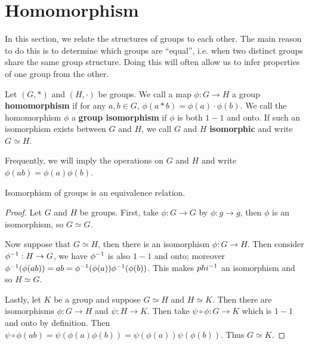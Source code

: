 \section{Homomorphism}
\label{section_1.5}

In this section, we relate the structures of groups to each other. The main
reason to do this is to determine which groups are ``equal'', i.e. when two
distinct groups share the same group structure. Doing this will often allow us
to infer properties of one group from the other.

\begin{definition}
  Let $(G, \ast)$ and $(H, \cdot)$ be groups. We call a map $\phi:G
  \rightarrow H$ a group \textbf{homomorphism} if for any $a,b \in G$,
  $\phi(a \ast b)=\phi(a) \cdot \phi(b)$. We call the homomorphism $\phi$ a
  \textbf{group isomorphism} if $\phi$ is both  $1-1$ and onto. If such an
  isomorphism exists between  $G$ and  $H$, we call  $G$ and  $H$
  \textbf{isomorphic} and write $G \simeq H$.
\end{definition}
\begin{remark}
  Frequently, we will imply the operations on $G$ and  $H$ and write
  $\phi(ab)=\phi(a)\phi(b)$.
\end{remark}

\begin{lemma}\label{lemma_1.5.1}
  Isomorphism of groups is an equivalence relation.
\end{lemma}
\begin{proof}
  Let $G$ and  $H$ be groups. First, take $\phi:G \rightarrow G$ by $\phi:g
  \rightarrow g$, then $\phi$ is an isomorphism, so $G \simeq G$.

  Now suppose that  $G \simeq H$, then there is an isomorphism  $\phi:G
  \rightarrow H$. Then consider $\phi^{-1}:H \rightarrow G$, we have
  $\phi^{-1}$ is also $1-1$ and onto; moreover
  $\phi^{-1}(\phi(ab))=ab=\phi^{-1}(\phi(a))\phi^{-1}(\phi(b))$. This makes
  $phi^{-1}$ an isomorphism and so $H \simeq G$.

  Lastly, let  $K$ be a group and suppose  $G \simeq H$ and  $H \simeq K$.
  Then there are isomorphisms  $\phi:G \rightarrow H$ and $\psi:H \rightarrow
  K$. Then take $\psi \circ \phi:G \rightarrow K$ which is $1-1$ and onto by
  definition. Then $\psi \circ
  \phi(ab)=\psi(\phi(a)\phi(b))=\psi(\phi(a))\psi(\phi(b))$. Thus $G \simeq
  K$.
\end{proof}

